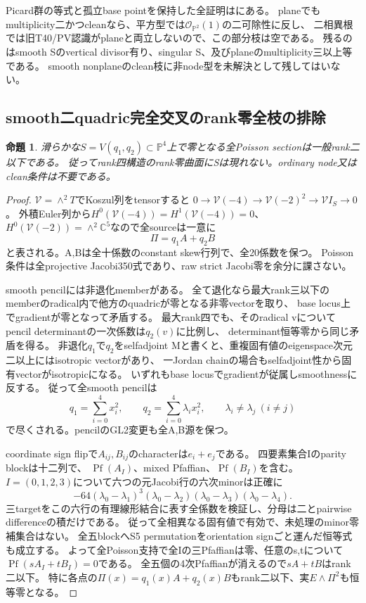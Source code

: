 \documentclass[a4paper,11pt]{ltjsarticle}
\newtheorem{proposition}{命題}[section]
\theoremstyle{definition}
\begin{document}
Picard群の等式と孤立base pointを保持した全証明はにある。
planeでもmultiplicity二かつcleanなら、平方型では$\mathcal O_{\mathbb P^2}(1)$の二可除性に反し、
二相異根では旧T40/PV認識がplaneと両立しないので、この部分枝は空である。
残るのはsmooth Sのvertical divisor有り、singular S、及びplaneのmultiplicity三以上等である。
smooth nonplaneのclean枝に非node型を未解決として残してはいない。

\subsection{smooth二quadric完全交叉のrank零全枝の排除}
\begin{proposition}\label{prop:smooth-CI22-zero}
滑らかな$S=V(q_1,q_2)\subset\mathbb P^4$上で零となる全Poisson sectionは一般rank二以下である。
従ってrank四構造のrank零曲面にSは現れない。ordinary node又はclean条件は不要である。
\end{proposition}
\begin{proof}
$\mathcal V=\wedge^2T$でKoszul列をtensorすると
$0\to\mathcal V(-4)\to\mathcal V(-2)^2\to\mathcal V I_S\to0$。
外積Euler列から$H^0(\mathcal V(-4))=H^1(\mathcal V(-4))=0$、
$H^0(\mathcal V(-2))=\wedge^2\mathbb C^5$なので全sourceは一意に
\[
 \Pi=q_1A+q_2B
\]
と表される。A,Bは全十係数のconstant skew行列で、全20係数を保つ。
Poisson条件は全projective Jacobi350式であり、raw strict Jacobi零を余分に課さない。

smooth pencilには非退化memberがある。
全て退化なら最大rank三以下のmemberのradical内で他方のquadricが零となる非零vectorを取り、
base locus上でgradientが零となって矛盾する。
最大rank四でも、そのradical vについてpencil determinantの一次係数は$q_2(v)$に比例し、
determinant恒等零から同じ矛盾を得る。
非退化$q_1$で$q_2$をselfadjoint Mと書くと、重複固有値のeigenspace次元二以上にはisotropic vectorがあり、
一Jordan chainの場合もselfadjoint性から固有vectorがisotropicになる。
いずれもbase locusでgradientが従属しsmoothnessに反する。
従って全smooth pencilは
\[
 q_1=\sum_{i=0}^4x_i^2,\qquad q_2=\sum_{i=0}^4\lambda_i x_i^2,
 \qquad\lambda_i\ne\lambda_j\ (i\ne j)
\]
で尽くされる。pencilのGL2変更も全A,B源を保つ。

coordinate sign flipで$A_{ij},B_{ij}$のcharacterは$e_i+e_j$である。
四要素集合Iのparity blockは十二列で、
$\operatorname{Pf}(A_I)$、mixed Pfaffian、$\operatorname{Pf}(B_I)$を含む。
$I=(0,1,2,3)$について六つの元Jacobi行の六次minorは正確に
\[
 -64(\lambda_0-\lambda_1)^3(\lambda_0-\lambda_2)
       (\lambda_0-\lambda_3)(\lambda_0-\lambda_4).
\]
三targetをこの六行の有理線形結合に表す全係数を検証し、分母は二とpairwise differenceの積だけである。
従って全相異なる固有値で有効で、未処理のminor零補集合はない。
全五blockへS5 permutationをorientation signごと運んだ恒等式も成立する。
よって全Poisson支持で全Iの三Pfaffianは零、任意のs,tについて
$\operatorname{Pf}(sA_I+tB_I)=0$である。
全五個の4次Pfaffianが消えるので$sA+tB$はrank二以下。
特に各点の$\Pi(x)=q_1(x)A+q_2(x)B$もrank二以下、実$E\wedge\Pi^2$も恒等零となる。
\end{proof}
\end{document}
